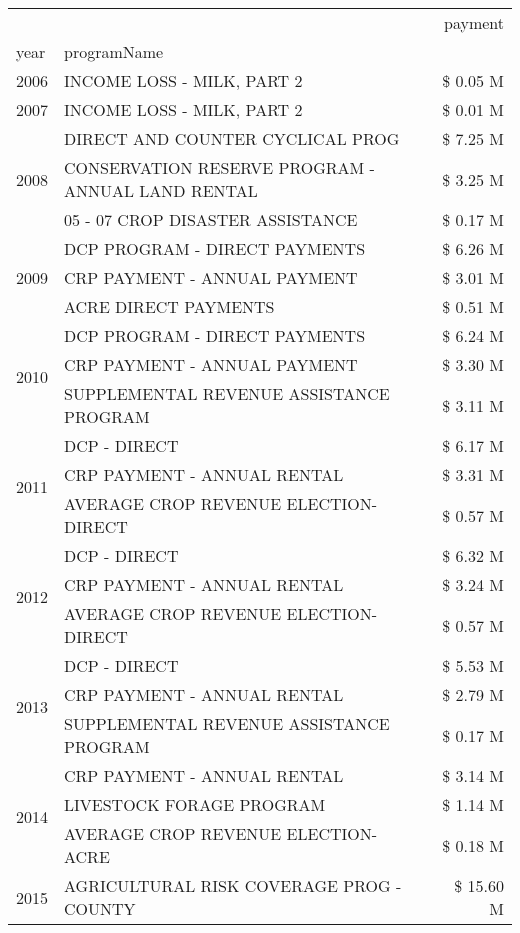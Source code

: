 \begin{tabular}{llr}
\toprule
 &  & payment \\
year & programName &  \\
\midrule
2006 & INCOME LOSS - MILK, PART 2 & \$ 0.05 M \\
\cline{1-3}
2007 & INCOME LOSS - MILK, PART 2 & \$ 0.01 M \\
\cline{1-3}
\multirow[t]{3}{*}{2008} & DIRECT AND COUNTER CYCLICAL PROG & \$ 7.25 M \\
 & CONSERVATION RESERVE PROGRAM - ANNUAL LAND RENTAL & \$ 3.25 M \\
 & 05 - 07 CROP DISASTER ASSISTANCE & \$ 0.17 M \\
\cline{1-3}
\multirow[t]{3}{*}{2009} & DCP PROGRAM - DIRECT PAYMENTS & \$ 6.26 M \\
 & CRP PAYMENT - ANNUAL PAYMENT & \$ 3.01 M \\
 & ACRE DIRECT PAYMENTS & \$ 0.51 M \\
\cline{1-3}
\multirow[t]{3}{*}{2010} & DCP PROGRAM - DIRECT PAYMENTS & \$ 6.24 M \\
 & CRP PAYMENT - ANNUAL PAYMENT & \$ 3.30 M \\
 & SUPPLEMENTAL REVENUE ASSISTANCE PROGRAM & \$ 3.11 M \\
\cline{1-3}
\multirow[t]{3}{*}{2011} & DCP - DIRECT & \$ 6.17 M \\
 & CRP PAYMENT - ANNUAL RENTAL & \$ 3.31 M \\
 & AVERAGE CROP REVENUE ELECTION-DIRECT & \$ 0.57 M \\
\cline{1-3}
\multirow[t]{3}{*}{2012} & DCP - DIRECT & \$ 6.32 M \\
 & CRP PAYMENT - ANNUAL RENTAL & \$ 3.24 M \\
 & AVERAGE CROP REVENUE ELECTION-DIRECT & \$ 0.57 M \\
\cline{1-3}
\multirow[t]{3}{*}{2013} & DCP - DIRECT & \$ 5.53 M \\
 & CRP PAYMENT - ANNUAL RENTAL & \$ 2.79 M \\
 & SUPPLEMENTAL REVENUE ASSISTANCE PROGRAM & \$ 0.17 M \\
\cline{1-3}
\multirow[t]{3}{*}{2014} & CRP PAYMENT - ANNUAL RENTAL & \$ 3.14 M \\
 & LIVESTOCK FORAGE PROGRAM & \$ 1.14 M \\
 & AVERAGE CROP REVENUE ELECTION-ACRE & \$ 0.18 M \\
\cline{1-3}
\multirow[t]{3}{*}{2015} & AGRICULTURAL RISK COVERAGE PROG - COUNTY & \$ 15.60 M \\

\end{tabular}
